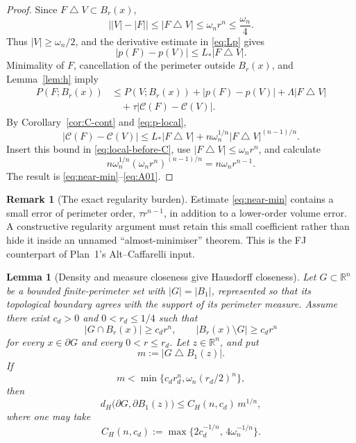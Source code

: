 \documentclass[11pt]{amsart}
\newtheorem{lemma}[theorem]{Lemma}
\theoremstyle{definition}
\newtheorem{remark}[theorem]{Remark}
\newcommand{\R}{\mathbb R}
\newcommand{\Per}{P}
\begin{document}
\begin{proof}
Since \(F\mathbin{\triangle}V\subset B_r(x)\),
\[
   \bigl||V|-|F|\bigr|\le |F\mathbin{\triangle}V|
   \le\omega_n r^n\le\frac{\omega_n}{4}.
\]
Thus \(|V|\ge\omega_n/2\), and the derivative estimate in
\eqref{eq:Lp} gives
\[
   |p(F)-p(V)|\le L_*|F\mathbin{\triangle}V|.
\tag{4.29}\label{eq:p-local}
\]
Minimality of \(F\), cancellation of the perimeter outside \(B_r(x)\), and
Lemma~\ref{lem:h} imply
\[
\begin{aligned}
   \Per(F;B_r(x))
   &\le \Per(V;B_r(x))
      +|p(F)-p(V)|
      +\Lambda|F\mathbin{\triangle}V| \\
   &\quad+\tau|\mathcal C(F)-\mathcal C(V)|.
\end{aligned}
\tag{4.30}\label{eq:local-before-C}
\]
By Corollary~\ref{cor:C-cont} and \eqref{eq:p-local},
\[
   |\mathcal C(F)-\mathcal C(V)|
   \le L_*|F\mathbin{\triangle}V|
      +n\omega_n^{1/n}|F\mathbin{\triangle}V|^{(n-1)/n}.
\]
Insert this bound in \eqref{eq:local-before-C}, use
\(|F\mathbin{\triangle}V|\le\omega_n r^n\), and calculate
\[
   n\omega_n^{1/n}(\omega_n r^n)^{(n-1)/n}
   =n\omega_n r^{n-1}.
\]
The result is \eqref{eq:near-min}--\eqref{eq:A01}.
\end{proof}

\begin{remark}[The exact regularity burden]\label{rem:near-min-burden}
Estimate \eqref{eq:near-min} contains a small error of perimeter order,
\(\tau r^{n-1}\), in addition to a lower-order volume error.  A constructive
regularity argument must retain this small coefficient rather than hide it
inside an unnamed ``almost-minimiser'' theorem.  This is the FJ counterpart
of Plan~1's Alt--Caffarelli input.
\end{remark}

\begin{lemma}[Density and measure closeness give Hausdorff closeness]
\label{lem:FJ-density-Hausdorff}
Let \(G\subset\R^n\) be a bounded finite-perimeter set with
\(|G|=|B_1|\), represented so that its topological boundary agrees with
the support of its perimeter measure.  Assume there exist \(c_d>0\) and
\(0<r_d\le1/4\) such that
\[
   |G\cap B_r(x)|\ge c_d r^n,\qquad
   |B_r(x)\setminus G|\ge c_d r^n
\tag{4.31}\label{eq:density-input}
\]
for every \(x\in\partial G\) and every \(0<r\le r_d\).
Let \(z\in\R^n\), and put
\[
   m:=|G\mathbin{\triangle}B_1(z)|.
\]
If
\[
   m<\min\{c_dr_d^n,\omega_n(r_d/2)^n\},
\tag{4.32}\label{eq:m-small-H}
\]
then
\[
   d_H\bigl(\partial G,\partial B_1(z)\bigr)
   \le C_H(n,c_d)\,m^{1/n},
\tag{4.33}\label{eq:hausdorff-from-measure}
\]
where one may take
\[
   C_H(n,c_d):=\max\{2c_d^{-1/n},\,4\omega_n^{-1/n}\}.
\tag{4.34}\label{eq:CH}
\]
\end{lemma}
\end{document}
